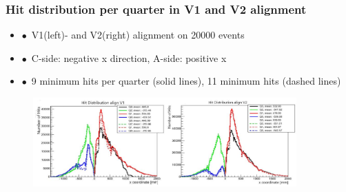 \documentclass[aspectratio=1610, 12pt]{beamer}
\begin{document}
\begin{frame}\frametitle{Hit distribution per quarter in V1 and V2 alignment}
  \begin{itemize}
    \item $\bullet$\, V1(left)- and V2(right) alignment on 20000 events
    \item $\bullet$\, C-side: negative x direction, A-side: positive x
    \item $\bullet$\, 9 minimum hits per quarter (solid lines), 11 minimum hits (dashed lines)
  \end{itemize}
  \begin{figure}
      \includegraphics[width=0.9\textwidth]{logos/v1_v2.png}%
  \end{figure}
\end{frame}
\end{document}
